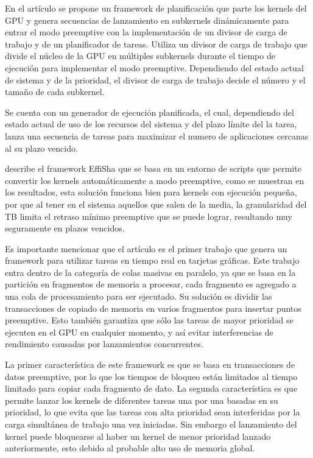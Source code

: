En el artículo \cite{RTFG} se propone un framework de planificación que parte los kernels del GPU y genera secuencias de lanzamiento en subkernels dinámicamente para entrar el modo preemptive con la implementación de un divisor de carga de trabajo y de un planificador de tareas. Utiliza un divisor de carga de trabajo que divide el núcleo de la GPU en múltiples subkernels durante el tiempo de ejecución para implementar el modo preemptive. Dependiendo del estado actual de sistema y de la prioridad, el divisor de carga de trabajo decide el número y el tamaño de cada subkernel. 

\vspace{0.3cm}

Se cuenta con un generador de ejecución planificada, el cual, dependiendo del estado actual de uso de los recursos del sistema y del plazo límite del la tarea, lanza una secuencia de tareas para maximizar el numero de aplicaciones cercanas al su plazo vencido.	

 \cite{Effisha} describe el framework EffiSha que se basa en un entorno de scripts que permite convertir los kernels automáticamente a modo preemptive, como se muestran en los resultados, esta solución funciona bien para kernels con ejecución pequeña, por que al tener en el sistema aquellos que salen de la media, la granularidad del TB limita el retraso mínimo preemptive que se puede lograr, resultando muy seguramente en plazos vencidos.
 
 
 Es importante mencionar que el artículo \cite{RGEM} es el primer trabajo que genera un framework para utilizar tareas en tiempo real en tarjetas gráficas. Este trabajo entra dentro de la categoría de colas masivas en paralelo, ya que se basa en la partición en fragmentos de memoria a procesar, cada fragmento es agregado a una cola de procesamiento para ser ejecutado. Su solución es dividir las transacciones de copiado de memoria en varios fragmentos para insertar puntos preemptive. Esto también garantiza que sólo las tareas de mayor prioridad se ejecuten en el GPU en cualquier momento, y así evitar interferencias de rendimiento causadas por lanzamientos concurrentes.
	
	\vspace{0.3cm}
	
	La primer característica de este framework es que se basa en transacciones de datos preemptive, por lo que los tiempos de bloqueo están limitados al tiempo limitado para copiar cada fragmento de dato. La segunda característica es que permite lanzar los kernels de diferentes tareas una por una basadas en su prioridad, lo que evita que las tareas con alta prioridad sean interferidas por la carga simultánea de trabajo una vez iniciadas. Sin embargo el lanzamiento del kernel puede bloquearse al haber un kernel de menor prioridad lanzado anteriormente, esto debido al probable alto uso de memoria global.
	
